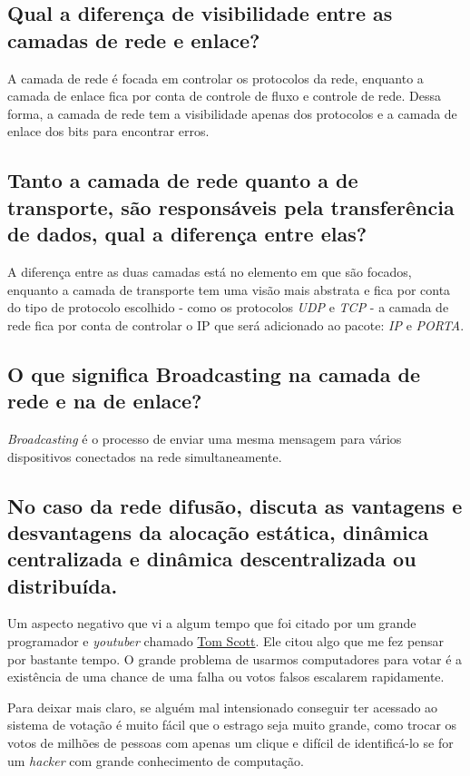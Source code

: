 \subsection{Qual a diferença de visibilidade entre as camadas de rede e
enlace?}

A camada de rede é focada em controlar os protocolos
da rede, enquanto a camada de enlace fica por conta 
de controle de fluxo e controle de rede. Dessa forma,
a camada de rede tem a visibilidade apenas dos protocolos
e a camada de enlace dos bits para encontrar erros.

\subsection{Tanto a camada de rede quanto a de transporte, são
responsáveis pela transferência de dados, qual a diferença
entre elas?}

A diferença entre as duas camadas está no elemento em que 
são focados, enquanto a camada de transporte tem uma visão
mais abstrata e fica por conta do tipo de protocolo escolhido
- como os protocolos \emph{UDP} e \emph{TCP} - a camada de rede
fica por conta de controlar o IP que será adicionado ao pacote:
\emph{IP} e \emph{PORTA}.
 
\subsection{O que significa Broadcasting na camada de rede e na de
enlace?}

\emph{Broadcasting} é o processo de enviar uma mesma mensagem
para vários dispositivos conectados na rede simultaneamente.

\subsection{No caso da rede difusão, discuta as vantagens e
desvantagens da alocação estática, dinâmica centralizada e
dinâmica descentralizada ou distribuída.}

Um aspecto negativo que vi a algum tempo que foi citado
por um grande programador e \emph{youtuber} chamado 
\hyperlink{https://www.youtube.com/c/TomScottGo}{Tom Scott}.
Ele citou algo que me fez pensar por bastante tempo.
O grande problema de usarmos computadores para votar é a existência
de uma chance de uma falha ou votos falsos escalarem rapidamente\cite{WEBSITE:1}. 

Para deixar mais claro,
se alguém mal intensionado conseguir ter acessado ao sistema de votação
é muito fácil que o estrago seja muito grande, como trocar os votos de milhões
de pessoas com apenas um clique e difícil de identificá-lo se for um 
\emph{hacker} com grande conhecimento de computação.